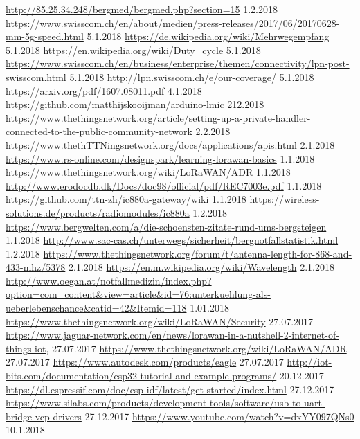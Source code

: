\documentclass[11pt,english,german]{report}
\theoremstyle{definition}
\begin{document}
\begin{thebibliography}{1}
	 \url{http://85.25.34.248/bergmed/bergmed.php?section=15} 1.2.2018
	 \url{https://www.swisscom.ch/en/about/medien/press-releases/2017/06/20170628-mm-5g-speed.html} 5.1.2018
	 \url{https://de.wikipedia.org/wiki/Mehrwegempfang} 5.1.2018
	 \url{https://en.wikipedia.org/wiki/Duty_cycle} 5.1.2018
	 \url{https://www.swisscom.ch/en/business/enterprise/themen/connectivity/lpn-post-swisscom.html} 5.1.2018
	 \url{http://lpn.swisscom.ch/e/our-coverage/} 5.1.2018
	 \url{https://arxiv.org/pdf/1607.08011.pdf} 4.1.2018
	 \url{https://github.com/matthijskooijman/arduino-lmic} 212.2018
	 \url{https://www.thethingsnetwork.org/article/setting-up-a-private-handler-connected-to-the-public-community-network} 2.2.2018
	 \url{https://www.thethTTNingsnetwork.org/docs/applications/apis.html} 2.1.2018
	 \url{https://www.rs-online.com/designspark/learning-lorawan-basics} 1.1.2018
	 \url{https://www.thethingsnetwork.org/wiki/LoRaWAN/ADR} 1.1.2018
	 \url{http://www.erodocdb.dk/Docs/doc98/official/pdf/REC7003e.pdf} 1.1.2018
	 \url{https://github.com/ttn-zh/ic880a-gateway/wiki} 1.1.2018
	 \url{https://wireless-solutions.de/products/radiomodules/ic880a} 1.2.2018
	 \url{https://www.bergwelten.com/a/die-schoensten-zitate-rund-ums-bergsteigen} 1.1.2018
	 \url{http://www.sac-cas.ch/unterwegs/sicherheit/bergnotfallstatistik.html} 1.2.2018
	 \url{https://www.thethingsnetwork.org/forum/t/antenna-length-for-868-and-433-mhz/5378} 2.1.2018
	 \url{https://en.m.wikipedia.org/wiki/Wavelength} 2.1.2018\\
	 \url{http://www.oegan.at/notfallmedizin/index.php?option=com_content&view=article&id=76:unterkuehlung-als-ueberlebenschance&catid=42&Itemid=118} 1.01.2018
	 \url{https://www.thethingsnetwork.org/wiki/LoRaWAN/Security} 27.07.2017
	 \url{https://www.jaguar-network.com/en/news/lorawan-in-a-nutshell-2-internet-of-things-iot}, 27.07.2017
	 \url{https://www.thethingsnetwork.org/wiki/LoRaWAN/ADR} 27.07.2017
	 \url{https://www.autodesk.com/products/eagle} 27.07.2017
	 \url{http://iot-bits.com/documentation/esp32-tutorial-and-example-programs/} 20.12.2017
	 \url{https://dl.espressif.com/doc/esp-idf/latest/get-started/index.html} 27.12.2017
	 \url{https://www.silabs.com/products/development-tools/software/usb-to-uart-bridge-vcp-drivers} 27.12.2017
	 \url{https://www.youtube.com/watch?v=dxYY097QNs0} 10.1.2018
\end{thebibliography}
\end{document}
